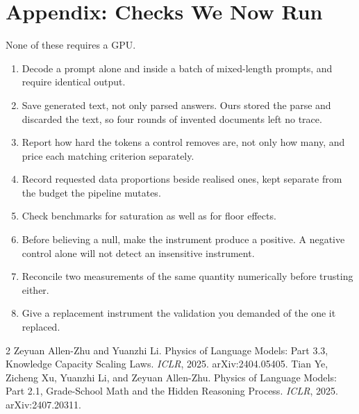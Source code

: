 \documentclass[10pt,twocolumn]{article}
\begin{document}
\section*{Appendix: Checks We Now Run}

None of these requires a GPU.

\small
\begin{enumerate}\itemsep0em\parskip0em\leftmargin1em
\item Decode a prompt alone and inside a batch of mixed-length prompts, and
  require identical output.
\item Save generated text, not only parsed answers. Ours stored the parse and
  discarded the text, so four rounds of invented documents left no trace.
\item Report how hard the tokens a control removes are, not only how many, and
  price each matching criterion separately.
\item Record requested data proportions beside realised ones, kept separate
  from the budget the pipeline mutates.
\item Check benchmarks for saturation as well as for floor effects.
\item Before believing a null, make the instrument produce a positive. A
  negative control alone will not detect an insensitive instrument.
\item Reconcile two measurements of the same quantity numerically before
  trusting either.
\item Give a replacement instrument the validation you demanded of the one it
  replaced.
\end{enumerate}

\begin{thebibliography}{2}
 Zeyuan Allen-Zhu and Yuanzhi Li.
  Physics of Language Models: Part 3.3, Knowledge Capacity Scaling Laws.
  \emph{ICLR}, 2025. arXiv:2404.05405.
 Tian Ye, Zicheng Xu, Yuanzhi Li, and Zeyuan Allen-Zhu.
  Physics of Language Models: Part 2.1, Grade-School Math and the Hidden
  Reasoning Process. \emph{ICLR}, 2025. arXiv:2407.20311.
\end{thebibliography}
\end{document}
